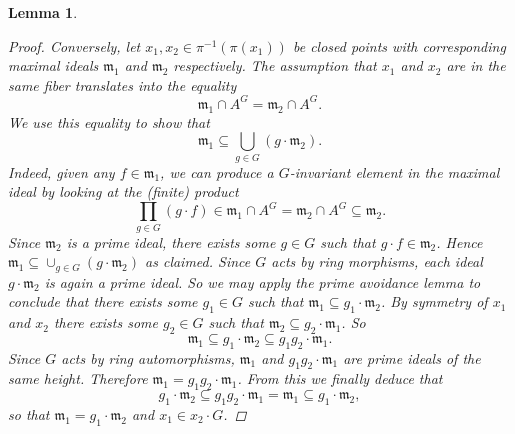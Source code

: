 \documentclass[12pt,a4paper]{amsart}
\theoremstyle{plain}
\newtheorem{lm}[thm]{Lemma}
\theoremstyle{definition}
\theoremstyle{remark}
\begin{document}
\begin{lm}
\begin{proof}
    Conversely, let $x_{1}, x_{2} \in \pi^{-1}(\pi(x_{1}))$ be closed points with corresponding maximal ideals $\mathfrak{m}_{1}$ and $\mathfrak{m}_{2}$ respectively.
    The assumption that $x_{1}$ and $x_{2}$ are in the same fiber translates into the equality
    \[ \mathfrak{m}_{1} \cap A^{G} = \mathfrak{m}_{2} \cap A^{G}. \]
    We use this equality to show that
    \[ \mathfrak{m}_{1} \subseteq \bigcup_{g \in G} (g \cdot \mathfrak{m}_{2}). \]
    Indeed, given any $f \in \mathfrak{m}_{1}$, we can produce a $G$-invariant element in the maximal ideal by looking at the (finite) product
    \[ \prod_{g \in G} (g \cdot f) \in \mathfrak{m}_{1} \cap A^{G} = \mathfrak{m}_{2} \cap A^{G} \subseteq \mathfrak{m}_{2}. \]
    Since $\mathfrak{m}_{2}$ is a prime ideal, there exists some $g \in G$ such that $g \cdot f \in \mathfrak{m}_{2}$.
    Hence $\mathfrak{m}_{1} \subseteq \cup_{g \in G} (g \cdot \mathfrak{m}_{2})$ as claimed.
    Since $G$ acts by ring morphisms, each ideal $g \cdot \mathfrak{m}_{2}$ is again a prime ideal.
    So we may apply the prime avoidance lemma to conclude that there exists some $g_{1} \in G$ such that $\mathfrak{m}_{1} \subseteq g_{1} \cdot \mathfrak{m}_{2}$.
    By symmetry of $x_{1}$ and $x_{2}$ there exists some $g_{2} \in G$ such that $\mathfrak{m}_{2} \subseteq g_{2} \cdot \mathfrak{m}_{1}$.
    So
    \[ \mathfrak{m}_{1} \subseteq g_{1} \cdot \mathfrak{m}_{2} \subseteq g_{1} g_{2} \cdot \mathfrak{m}_{1}. \]
    Since $G$ acts by ring automorphisms, $\mathfrak{m}_{1}$ and $g_{1} g_{2} \cdot \mathfrak{m}_{1}$ are prime ideals of the same height.
    Therefore $\mathfrak{m}_{1} = g_{1} g_{2} \cdot \mathfrak{m}_{1}$.
    From this we finally deduce that
    \[ g_{1} \cdot \mathfrak{m}_{2} \subseteq g_{1}g_{2} \cdot \mathfrak{m}_{1} = \mathfrak{m}_{1} \subseteq g_{1} \cdot \mathfrak{m}_{2}, \]
    so that $\mathfrak{m}_{1} = g_{1} \cdot \mathfrak{m}_{2}$ and $x_{1} \in x_{2} \cdot G$.
  \end{proof}
\end{lm}
\end{document}
